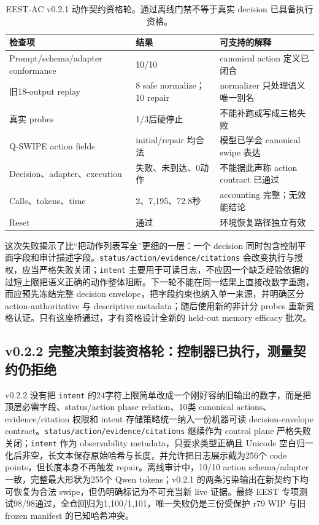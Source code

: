 \documentclass[12pt,a4paper]{ctexart}
\begin{document}
\begin{table}[H]
    \centering
    \caption{EEST-AC v0.2.1 动作契约资格轮。通过离线门禁不等于真实 decision 已具备执行资格。}
    \label{tab:eest-v021}
    \small
    \begin{tabularx}{\textwidth}{p{4.5cm}p{3.2cm}Y}
        \toprule
        检查项 & 结果 & 可支持的解释 \\
        \midrule
        Prompt/schema/adapter conformance & 10/10 & canonical action 定义已闭合 \\
        旧18-output replay & 8 safe normalize；10 repair & normalizer 只处理语义唯一别名 \\
        真实 probes & 1/3后硬停止 & 不能补跑或写成三格失败 \\
        Q-SWIPE action fields & initial/repair 均合法 & 模型已学会 canonical swipe 表达 \\
        Decision、adapter、execution & 失败、未到达、0动作 & 不能据此声称 action contract 已通过 \\
        Calls、tokens、time & 2、7,195、72.8秒 & accounting 完整；无效能结论 \\
        Reset & 通过 & 环境恢复路径独立有效 \\
        \bottomrule
    \end{tabularx}
\end{table}

这次失败揭示了比“把动作列表写全”更细的一层：一个 decision 同时包含控制平面字段和审计描述字段。\texttt{status/action/evidence/citations} 会改变执行与授权，应当严格失败关闭；\texttt{intent} 主要用于可读日志，不应因一个缺乏经验依据的过短上限把语义正确的动作整体阻断。下一轮不能在同一结果上直接改数字重跑，而应预先冻结完整 decision envelope，把字段约束也纳入单一来源，并明确区分 action-authoritative 与 descriptive metadata；随后使用新的非计分 probes 重新资格认证。只有这座桥通过，才有资格设计全新的 held-out memory efficacy 批次。

\subsection{v0.2.2 完整决策封装资格轮：控制器已执行，测量契约仍拒绝}

v0.2.2 没有把 \texttt{intent} 的24字符上限简单改成一个刚好容纳旧输出的数字，而是把顶层必需字段、status/action phase relation、10类 canonical actions、evidence/citation 权限和 intent 存储策略统一纳入一份机器可读 decision-envelope contract。\texttt{status/action/evidence/citations} 继续作为 control plane 严格失败关闭；\texttt{intent} 作为 observability metadata，只要求类型正确且 Unicode 空白归一化后非空，长文本保存原始哈希与长度，并允许把日志展示截为256个 code points，但长度本身不再触发 repair。离线审计中，10/10 action schema/adapter 一致，完整最大形状为255个 Qwen tokens；v0.2.1 的两条污染输出在新契约下均可恢复为合法 swipe，但仍明确标记为不可充当新 live 证据。最终 EEST 专项测试98/98通过，全仓回归为1,100/1,101，唯一失败仍是三份受保护 r79 WIP 与旧 frozen manifest 的已知哈希冲突。
\end{document}
